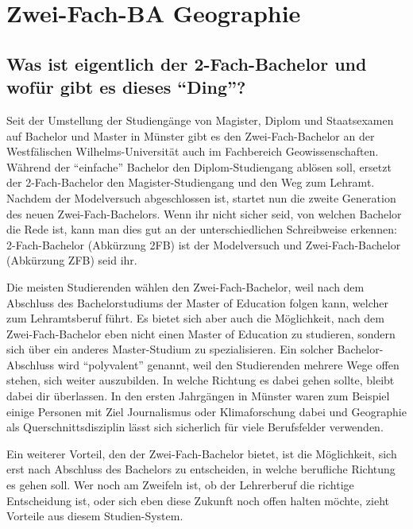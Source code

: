 \chapter{Zwei-Fach-BA Geographie}

\section*{Was ist eigentlich der 2-Fach-Bachelor und wofür gibt es dieses "`Ding"'?}
Seit der Umstellung der Studiengänge von Magister, Diplom und Staatsexamen auf Bachelor und Master in Münster gibt es den Zwei-Fach-Bachelor an der Westfälischen Wilhelms-Universität auch im Fachbereich Geowissenschaften. Während der "`einfache"' Bachelor den Diplom-Studiengang ablösen soll, ersetzt der 2-Fach-Bachelor den Magister-Studiengang und den Weg zum Lehramt. Nachdem der Modelversuch abgeschlossen ist, startet nun die zweite Generation des neuen Zwei-Fach-Bachelors. Wenn ihr nicht sicher seid, von welchen Bachelor die Rede ist, kann man dies gut an der unterschiedlichen Schreibweise erkennen: 2-Fach-Bachelor (Abkürzung 2FB) ist der Modelversuch und Zwei-Fach-Bachelor (Abkürzung ZFB) seid ihr. 

Die meisten Studierenden wählen den Zwei-Fach-Bachelor, weil nach dem Abschluss des Bachelorstudiums der Master of Education folgen kann, welcher zum Lehramtsberuf führt. Es bietet sich aber auch die Möglichkeit, nach dem Zwei-Fach-Bachelor eben nicht einen Master of Education zu studieren, sondern sich über ein anderes Master-Studium zu spezialisieren. Ein solcher Bachelor-Abschluss wird "`polyvalent"' genannt, weil den Studierenden mehrere Wege offen stehen, sich weiter auszubilden. In welche Richtung es dabei gehen sollte, bleibt dabei dir überlassen. In den ersten Jahrgängen in Münster waren zum Beispiel einige Personen mit Ziel Journalismus oder Klimaforschung dabei und Geographie als Querschnittsdisziplin lässt sich sicherlich für viele Berufsfelder verwenden.

Ein weiterer Vorteil, den der Zwei-Fach-Bachelor bietet, ist die Möglichkeit, sich erst nach Abschluss des Bachelors zu entscheiden, in welche berufliche Richtung es gehen soll. Wer noch am Zweifeln ist, ob der Lehrerberuf die richtige Entscheidung ist, oder sich eben diese Zukunft noch offen halten möchte, zieht Vorteile aus diesem Studien-System.


